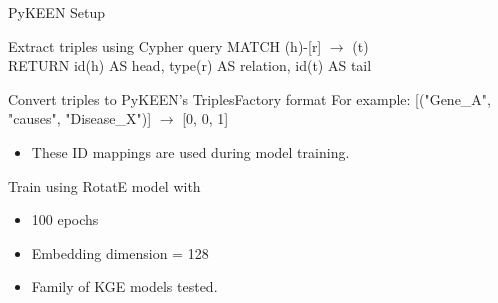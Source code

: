 \documentclass{beamer}
\begin{document}
\begin{frame}{PyKEEN Setup}
    \begin{block}{Extract triples using Cypher query}
        \scriptsize MATCH (h)-[r] $\rightarrow$ (t) \\
        RETURN id(h) AS head, type(r) AS relation, id(t) AS tail
    \end{block}

    \begin{block}{Convert triples to PyKEEN’s TriplesFactory format}
        \scriptsize For example: [("Gene\_A", "causes", "Disease\_X")] $\rightarrow$ [0, 0, 1] \\
        \begin{itemize}
            \item These ID mappings are used during model training.
        \end{itemize}
    \end{block}

    \begin{block}{Train using RotatE model with}
        \begin{itemize}
            \item \small 100 epochs
            \item \small Embedding dimension = 128
            \item \small Family of KGE models tested.
        \end{itemize}
    \end{block}
\end{frame}
\end{document}
